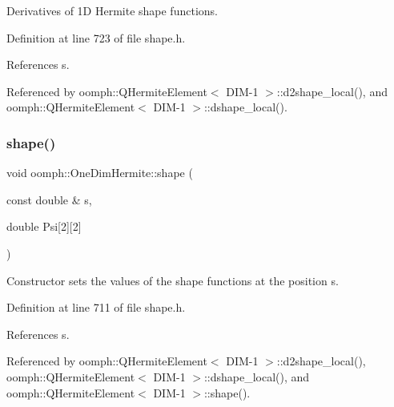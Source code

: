 Derivatives of 1D Hermite shape functions. 



Definition at line 723 of file shape.\+h.



References s.



Referenced by oomph\+::\+Q\+Hermite\+Element$<$ D\+I\+M-\/1 $>$\+::d2shape\+\_\+local(), and oomph\+::\+Q\+Hermite\+Element$<$ D\+I\+M-\/1 $>$\+::dshape\+\_\+local().

\mbox{\label{namespaceoomph_1_1OneDimHermite_aebab8114996e792678738c0b203ee6dc}} 
\subsubsection{\texorpdfstring{shape()}{shape()}}
{\footnotesize\ttfamily void oomph\+::\+One\+Dim\+Hermite\+::shape (\begin{DoxyParamCaption}\item[{const double \&}]{s,  }\item[{double}]{Psi\mbox{[}2\mbox{]}\mbox{[}2\mbox{]} }\end{DoxyParamCaption})\hspace{0.3cm}{\ttfamily [inline]}}



Constructor sets the values of the shape functions at the position s. 



Definition at line 711 of file shape.\+h.



References s.



Referenced by oomph\+::\+Q\+Hermite\+Element$<$ D\+I\+M-\/1 $>$\+::d2shape\+\_\+local(), oomph\+::\+Q\+Hermite\+Element$<$ D\+I\+M-\/1 $>$\+::dshape\+\_\+local(), and oomph\+::\+Q\+Hermite\+Element$<$ D\+I\+M-\/1 $>$\+::shape().

